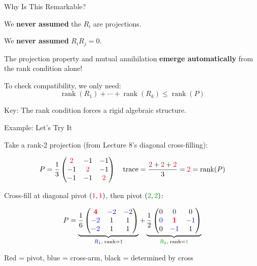 \documentclass[10pt]{beamer}
\theoremstyle{definition}
\newcommand{\x}[1]{\alert{\textbf{#1}}}
\newcommand{\pvt}[1]{{\color{red}\mathbf{#1}}}       %
\newcommand{\crs}[1]{{\color{blue}#1}}                %
\newcommand{\gn}[1]{{\color{green!60!black}#1}}       %
\newcommand{\rd}[1]{{\color{red}#1}}                  %
\newcommand{\bl}[1]{{\color{blue}#1}}                 %
\begin{document}
\begin{frame}{Why Is This Remarkable?}

We \x{never assumed} the $R_i$ are projections.

\vspace{0.3em}

We \x{never assumed} $R_i R_j = 0$.

\vspace{0.5em}

The projection property and mutual annihilation \x{emerge automatically} from the rank condition alone!

\vspace{0.5em}

To check compatibility, we only need:
$$\operatorname{rank}(R_1) + \cdots + \operatorname{rank}(R_k) \leq \operatorname{rank}(P)$$

\vspace{0.5em}

Key: The rank condition forces a rigid algebraic structure.

\end{frame}


\begin{frame}{Example: Let's Try It}

Take a rank-2 projection (from Lecture 8's diagonal cross-filling):

$$P = \frac{1}{3}\begin{pmatrix} \rd{2} & -1 & -1 \\ -1 & \rd{2} & -1 \\ -1 & -1 & \rd{2} \end{pmatrix} \quad \text{trace} = \frac{\rd{2}+\rd{2}+\rd{2}}{3} = \rd{2} = \operatorname{rank}(P)$$

\vspace{0.3em}

Cross-fill at diagonal pivot $(\rd{1},\rd{1})$, then pivot $(\gn{2},\gn{2})$:

$$P = \underbrace{\frac{1}{6}\begin{pmatrix} \pvt{4} & \crs{-2} & \crs{-2} \\ \crs{-2} & 1 & 1 \\ \crs{-2} & 1 & 1 \end{pmatrix}}_{\bl{R_1},\; \operatorname{rank} = \bl{1}} + \underbrace{\frac{1}{2}\begin{pmatrix} 0 & \crs{0} & 0 \\ \crs{0} & \pvt{1} & \crs{-1} \\ 0 & \crs{-1} & 1 \end{pmatrix}}_{\gn{R_2},\; \operatorname{rank} = \gn{1}}$$

{\small \rd{Red} = pivot, \crs{blue} = cross-arm, black = determined by cross}
\end{frame}
\end{document}
